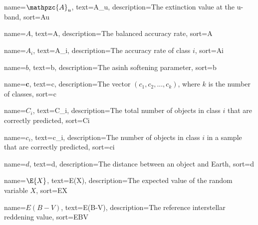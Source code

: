 

\providecommand\given{}
\DeclarePairedDelimiterXPP\E[1]{\mathbb{E}}{[}{]}{}{
	\renewcommand\given{  \nonscript\:
		\delimsize\vert
		\nonscript\:
		\mathopen{}
		\allowbreak}
	#1
}
\DeclarePairedDelimiterXPP\Prob[1]{\mathbb{P}}{(}{)}{}{
	\renewcommand\given{  \nonscript\:
		\delimsize\vert
		\nonscript\:
		\mathopen{}
		\allowbreak}
	#1
}
\DeclareMathOperator{\Beta}{Beta}
\DeclareMathOperator{\Bin}{Bin}
\DeclareMathOperator{\arsinh}{arsinh}
\newcommand{\A}{\mathpzc{A}}


%
{%
	name={$\A_u$},
	text={A_u},
	description={The extinction value at the u-band},
	sort={Au}
}

%
{%
	name={$A$},
	text={A},
	description={The balanced accuracy rate},
	sort={A}
}

%
{%
	name={$A_i$},
	text={A_i},
	description={The accuracy rate of class $i$},
	sort={Ai}
}

%
{%
	name={$b$},
	text={b},
	description={The asinh softening parameter},
	sort={b}
}

%
{%
	name={$\bm{c}$},
	text={c},
	description={The vector $(c_1, c_2,...,c_k)$, where $k$ is the number of classes},
	sort={c}
}

%
{%
	name={$C_i$},
	text={C_i},
	description={The total number of objects in class $i$ that are correctly predicted},
	sort={Ci}
}

%
{%
	name={$c_i$},
	text={c_i},
	description={The number of objects in class $i$ in a sample that are correctly predicted},
	sort={ci}
}

%
{%
	name={$d$},
	text={d},
	description={The distance between an object and Earth},
	sort={d}
}

%
{%
	name={$\E{X}$},
	text={E(X)},
	description={The expected value of the random variable $X$},
	sort={EX}
}

%
{%
	name={$E(B-V)$},
	text={E(B-V)},
	description={The reference interstellar reddening value},
	sort={EBV}
}

